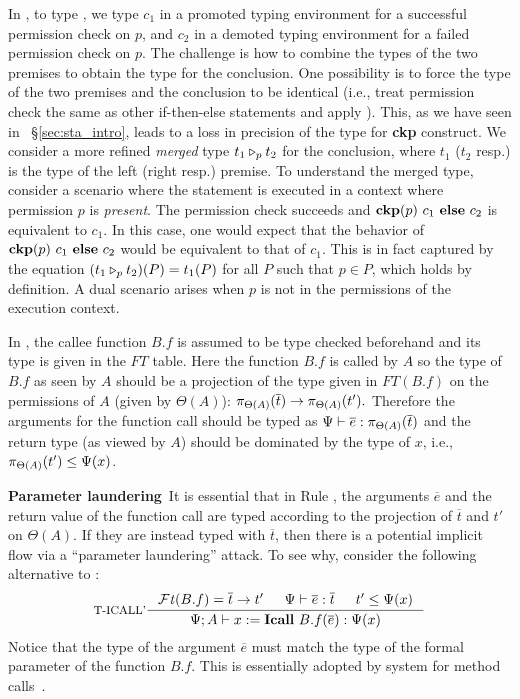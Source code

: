 {{{In , to type ,
we type $c_1$ in a promoted typing environment for a successful permission check on $p$, and $c_2$ in a demoted typing environment for a failed permission check on $p$.
The challenge is how to combine the types of the two premises  to obtain the type
for the conclusion. One possibility is to force
the type of the two premises and the conclusion to be identical (i.e., treat permission check the same as other if-then-else statements and apply ).
This, as we have seen in ~\S\ref{sec:sta_intro},
leads to a loss in precision of the type for \textbf{ckp} construct. We consider
a more refined \emph{merged} type $\omerge{p}{t_1}{t_2}$ for the conclusion,
where $t_1$ ($t_2$ resp.) is the type of the left (right resp.) premise.
To understand the merged type,
consider a scenario where the statement
is executed in a context where permission $p$ is \emph{present}.
The permission check succeeds and $\lcCP{p}{c_1}{c_2}$ is equivalent to $c_1$.
In this case, one would expect that the behavior of $\lcCP{p}{c_1}{c_2}$ would be
equivalent to that of $c_1$. This is in fact captured by the equation
$
(\omerge p {t_1} {t_2})(P) = t_1(P)
$
for all $P$ such that $p \in P$, which holds by definition. A dual scenario arises when
$p$ is not in the permissions of the execution context.

In , the callee function $B.f$ is assumed to be type checked beforehand
and its type is given in the $FT$ table. Here the function $B.f$ is called
by $A$ so the type of $B.f$ as seen by $A$ should be
a projection of the type given in $FT(B.f)$ on the permissions of $A$ (given by $\Theta(A)$):
$\app{\overline{t}}{\Theta(A)} \rightarrow \app{t'}{\Theta(A)}.$
Therefore the arguments for the function call should be typed
as
$\Psi \vdash \overline{e} : \app{\overline{t}}{\Theta(A)}$
and the return type (as viewed by $A$) should be dominated
by the type of $x$, i.e., $\app{t'}{\Theta(A)} \leq \Psi(x)$.


\textbf{Parameter laundering}~It is essential that in Rule , the arguments $\overline{e}$ and the return value of
the function call are typed according to the projection of $\overline{t}$ and $t'$ on $\Theta(A)$. If they are instead typed with $\overline{t}$, then there is a potential implicit flow via a ``parameter laundering'' attack. To see why, consider the following alternative to :
{\myeqsize\begin{equation*}
\inference[T-ICALL']
{
 \FT(B.f) = \overline{t} \rightarrow t' &
 \Psi \vdash \overline{e} :\overline{t} &
 t'  \leq \Psi(x)}
{\Psi; A \vdash \lcCALL{x}{B.f}{\overline{e}} :
  \Psi(x)}
\end{equation*}}
Notice that the type of the argument $\overline{e}$ must match the type of the formal parameter of the function $B.f$.  This is essentially adopted by {\BN} system for method calls~\cite{Banerjee:2005ht}.

}}}
